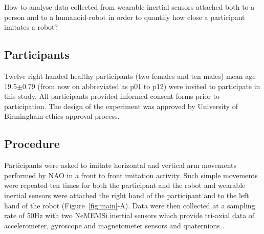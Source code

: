 \documentclass{sig-alternate-05-2015}
\begin{document}
How to analyse  data collected from wearable inertial sensors attached both 
to a person and to a humanoid-robot in order to quantify how close a participant 
imitates a robot?










\subsection{Participants}
Twelve right-handed healthy participants (two females and ten males)
mean age 19.5$\pm$0.79 (from now on abbreviated as p01 to p12) were invited to 
participate in this study. 
All participants provided informed consent forms prior to participation.
The design of the experiment was approved by University of Birmingham ethics approval
process. 


% 
\subsection{Procedure}
Participants were asked to imitate horizontal and vertical arm movements
performed by NAO in a front to front imitation activity.
Such simple movements were repeated ten times for both the participant and the robot
and wearable inertial sensors were attached the right hand of the participant and to the left hand of the robot
(Figure~\ref{fig:main}-A).
Data were then collected at a sampling rate of 50Hz with two NeMEMSi inertial sensors
which provide tri-axial data of accelerometer, gyroscope and magnetometer sensors and
quaternions \cite{Comotti2014}. 
\end{document}

